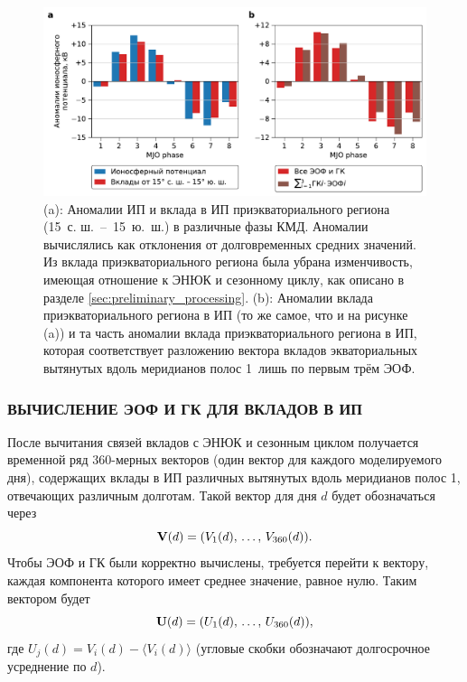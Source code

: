 \begin{figure}[htbp]
    \centering
    \includegraphics[width=\textwidth]{figures/equatorial_variations.pdf}
    \caption{(a): Аномалии ИП и вклада в ИП приэкваториального региона (15\textdegree\ с. ш.~--~15\textdegree~ю.~ш.) в различные фазы КМД. Аномалии вычислялись как отклонения от долговременных средних значений. Из вклада приэкваториального региона была убрана изменчивость, имеющая отношение к ЭНЮК и сезонному циклу, как описано в разделе \ref{sec:preliminary_processing}. (b): Аномалии вклада приэкваториального региона в ИП (то же самое, что и на рисунке (a)) и та часть аномалии вклада приэкваториального региона в ИП, которая соответствует разложению вектора вкладов экваториальных вытянутых вдоль меридианов полос 1\textdegree{}\textdegree\ лишь по первым трём ЭОФ.}
    \label{fig:eq_var}
\end{figure}

\subsubsection{ВЫЧИСЛЕНИЕ ЭОФ И ГК ДЛЯ ВКЛАДОВ В ИП}

После вычитания связей вкладов с ЭНЮК и сезонным циклом получается временной ряд 360-мерных векторов (один вектор для каждого моделируемого дня), содержащих вклады в ИП различных вытянутых вдоль меридианов полос 1\textdegree{}\textdegree, отвечающих различным долготам. Такой вектор для дня $d$ будет обозначаться через
\begin{equation}
    \vb{V}(d) = \qty(V_1(d),\, \ldots,\, V_{360}(d)).
\end{equation}
Чтобы ЭОФ и ГК были корректно вычислены, требуется перейти к вектору, каждая компонента которого имеет среднее значение, равное нулю. Таким вектором будет 
\begin{equation}
    \vb{U}(d) = \qty(U_1(d),\, \ldots,\, U_{360}(d)),
\end{equation}
где $U_j(d) = V_i(d) - \langle V_i(d) \rangle$ (угловые скобки обозначают долгосрочное усреднение по $d$).

